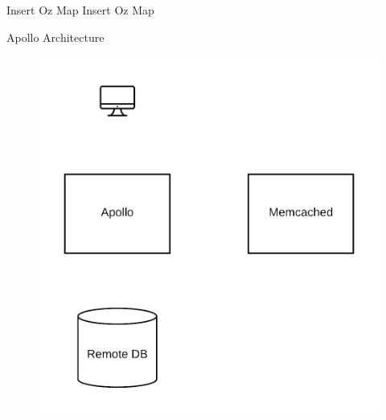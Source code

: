 \documentclass[10pt]{beamer}
\begin{document}
\begin{frame}[fragile]{Insert Oz Map}
Insert Oz Map
\end{frame}

\begin{frame}[fragile]{Apollo Architecture}
    \begin{figure}
        \includegraphics[scale=0.17]{apollo_arch_diagram}
    \end{figure}
\end{frame}
\end{document}
